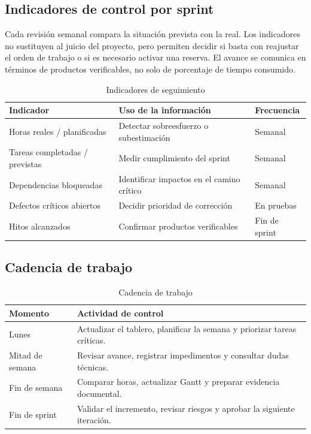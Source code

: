 \subsection{Indicadores de control por sprint}\label{sec:2-3-4}

Cada revisión semanal compara la situación prevista con la real. Los indicadores no sustituyen al juicio del proyecto, pero permiten decidir si basta con reajustar el orden de trabajo o si es necesario activar una reserva. El avance se comunica en términos de productos verificables, no solo de porcentaje de tiempo consumido.

\begin{table}[H]
\centering\small
\begin{tabularx}{\textwidth}{>{\hsize=1.054\hsize\raggedright\arraybackslash}X>{\hsize=1.404\hsize\raggedright\arraybackslash}X>{\hsize=0.542\hsize\raggedright\arraybackslash}X}
\toprule
\rowcolor{cabeceratabla} \textbf{Indicador} & \textbf{Uso de la información} & \textbf{Frecuencia} \\
\midrule
Horas reales / planificadas & Detectar sobreesfuerzo o subestimación & Semanal \\
Tareas completadas / previstas & Medir cumplimiento del sprint & Semanal \\
Dependencias bloqueadas & Identificar impactos en el camino crítico & Semanal \\
Defectos críticos abiertos & Decidir prioridad de corrección & En pruebas \\
Hitos alcanzados & Confirmar productos verificables & Fin de sprint \\
\bottomrule
\end{tabularx}
\caption{Indicadores de seguimiento}\label{tab:12}
\end{table}

\subsection{Cadencia de trabajo}\label{sec:2-3-5}

\begin{table}[H]
\centering\small
\begin{tabularx}{\textwidth}{>{\hsize=0.433\hsize\raggedright\arraybackslash}X>{\hsize=1.567\hsize\raggedright\arraybackslash}X}
\toprule
\rowcolor{cabeceratabla} \textbf{Momento} & \textbf{Actividad de control} \\
\midrule
Lunes & Actualizar el tablero, planificar la semana y priorizar tareas críticas. \\
Mitad de semana & Revisar avance, registrar impedimentos y consultar dudas técnicas. \\
Fin de semana & Comparar horas, actualizar Gantt y preparar evidencia documental. \\
Fin de sprint & Validar el incremento, revisar riesgos y aprobar la siguiente iteración. \\
\bottomrule
\end{tabularx}
\caption{Cadencia de trabajo}\label{tab:13}
\end{table}

